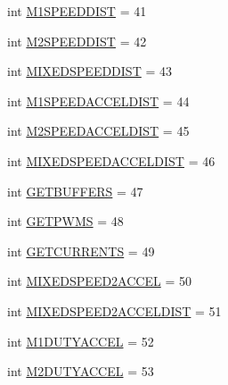 \begin{DoxyCompactItemize}
\item 
int \mbox{\hyperlink{classtoxic__hardware_1_1roboclaw__3_1_1Roboclaw_1_1Cmd_a02ad57ac2088ecadb26323dd94349cc4}{M1\+S\+P\+E\+E\+D\+D\+I\+ST}} = 41
\item 
int \mbox{\hyperlink{classtoxic__hardware_1_1roboclaw__3_1_1Roboclaw_1_1Cmd_add22920c1ebb1d0e13f0017474d212dc}{M2\+S\+P\+E\+E\+D\+D\+I\+ST}} = 42
\item 
int \mbox{\hyperlink{classtoxic__hardware_1_1roboclaw__3_1_1Roboclaw_1_1Cmd_a17c41e60e8e0ef3b1d46465936e3c9bf}{M\+I\+X\+E\+D\+S\+P\+E\+E\+D\+D\+I\+ST}} = 43
\item 
int \mbox{\hyperlink{classtoxic__hardware_1_1roboclaw__3_1_1Roboclaw_1_1Cmd_ae0cc23d22e15a200b9bc782346a54738}{M1\+S\+P\+E\+E\+D\+A\+C\+C\+E\+L\+D\+I\+ST}} = 44
\item 
int \mbox{\hyperlink{classtoxic__hardware_1_1roboclaw__3_1_1Roboclaw_1_1Cmd_a47ee184dd1cfd86291f58aced7de3821}{M2\+S\+P\+E\+E\+D\+A\+C\+C\+E\+L\+D\+I\+ST}} = 45
\item 
int \mbox{\hyperlink{classtoxic__hardware_1_1roboclaw__3_1_1Roboclaw_1_1Cmd_a7823fd7565a2e72f7a972b2fd517a985}{M\+I\+X\+E\+D\+S\+P\+E\+E\+D\+A\+C\+C\+E\+L\+D\+I\+ST}} = 46
\item 
int \mbox{\hyperlink{classtoxic__hardware_1_1roboclaw__3_1_1Roboclaw_1_1Cmd_ad36eda4158a5215ae5ee52401d24e39b}{G\+E\+T\+B\+U\+F\+F\+E\+RS}} = 47
\item 
int \mbox{\hyperlink{classtoxic__hardware_1_1roboclaw__3_1_1Roboclaw_1_1Cmd_aba1e3d225a2a3c61d8a2f2ce2f062d9c}{G\+E\+T\+P\+W\+MS}} = 48
\item 
int \mbox{\hyperlink{classtoxic__hardware_1_1roboclaw__3_1_1Roboclaw_1_1Cmd_a7b8aa436bab3175fc6904b1a9e790821}{G\+E\+T\+C\+U\+R\+R\+E\+N\+TS}} = 49
\item 
int \mbox{\hyperlink{classtoxic__hardware_1_1roboclaw__3_1_1Roboclaw_1_1Cmd_a075704022e7f303e509ecd4da010050f}{M\+I\+X\+E\+D\+S\+P\+E\+E\+D2\+A\+C\+C\+EL}} = 50
\item 
int \mbox{\hyperlink{classtoxic__hardware_1_1roboclaw__3_1_1Roboclaw_1_1Cmd_ae6218e53fcba38d3e0f217b83fa74275}{M\+I\+X\+E\+D\+S\+P\+E\+E\+D2\+A\+C\+C\+E\+L\+D\+I\+ST}} = 51
\item 
int \mbox{\hyperlink{classtoxic__hardware_1_1roboclaw__3_1_1Roboclaw_1_1Cmd_a0c3dd728d7b7946fb5e3d5febe55e15a}{M1\+D\+U\+T\+Y\+A\+C\+C\+EL}} = 52
\item 
int \mbox{\hyperlink{classtoxic__hardware_1_1roboclaw__3_1_1Roboclaw_1_1Cmd_ae4fd74abec7fef3501358139af2afdb2}{M2\+D\+U\+T\+Y\+A\+C\+C\+EL}} = 53

\end{DoxyCompactItemize}
